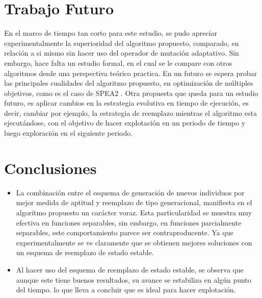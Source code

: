 \documentclass{llncs}
\begin{document}
\section{Trabajo Futuro}
En el marco de tiempo tan corto para este estudio, se pudo apreciar experimentalmente la superioridad del algoritmo propuesto, comparado, en relación a si mismo sin hacer uso del operador de mutación adaptativo. Sin embargo, hace falta un estudio formal, en el cual se le compare con otros algoritmos desde una perspectiva teórico practica.
En un futuro se espera probar las principales cualidades del algoritmo propuesto, en optimización de múltiples objetivos, como es el caso de SPEA2 \cite{zitzler:laumans:thiele}.
Otra propuesta que queda para un estudio futuro, es aplicar cambios en la estrategia evolutiva en tiempo de ejecución, es decir, cambiar por ejemplo, la estrategia de reemplazo mientras el algoritmo esta ejecutándose, con el objetivo de hacer explotación en un periodo de tiempo y luego exploración en el siguiente periodo.

\section{Conclusiones}

\begin{itemize}
\item La combinación entre el esquema de generación de nuevos individuos por mejor medida de aptitud y reemplazo de tipo generacional, manifiesta en el algoritmo propuesto un carácter voraz. Esta particularidad se muestra muy efectiva en funciones separables, sin embargo, en funciones parcialmente separables, este comportamiento parece ser contraproducente. Ya que experimentalmente se ve claramente que se obtienen mejores soluciones con un esquema de reemplazo de estado estable.
\item Al hacer uso del esquema de reemplazo de estado estable, se observa que aunque este tiene buenos resultados, su avance se estabiliza en algún punto del tiempo. lo que lleva a concluir que es ideal para hacer explotación. 
\end{itemize}
\end{document}
